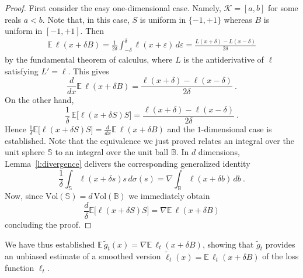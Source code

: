 \documentclass[11pt]{hackednow}
\newcommand{\E}{\mathbb{E}}
\newcommand{\cK}{\mathcal{K}}
\newcommand{\ve}{\varepsilon}
\newcommand{\Ball}{\mathbb{B}}
\newcommand{\Sphere}{\mathbb{S}}
\newcommand{\tloss}{\widetilde{\ell}}
\newcommand{\gtilde}{\widetilde{g}}
\begin{document}
%
\begin{proof}
First consider the easy one-dimensional case. Namely, $\cK = [a,b]$ for some reals $a < b$. Note that, in this case, $S$ is uniform in $\{-1,+1\}$ whereas $B$ is uniform in $[-1,+1]$. Then
\begin{align*}
    \E\,\ell(x + \delta B)
=
    \frac{1}{2\delta}\int_{-\delta}^{\delta} \ell(x + \ve)\,d\ve
=
    \frac{L(x+\delta) - L(x-\delta)}{2\delta}
\end{align*}
by the fundamental theorem of calculus, where $L$ is the antiderivative of $\ell$ satisfying $L' = \ell$.
This gives
\[
    \frac{d}{dx} \E\,\ell(x + \delta B) = \frac{\ell(x+\delta) - \ell(x-\delta)}{2\delta}~.
\]
On the other hand,
\[
    \frac{1}{\delta}\,\E\bigl[\ell(x + \delta S)S\bigr]
=
    \frac{\ell(x+\delta) - \ell(x-\delta)}{2\delta}~.
\]
Hence $\tfrac{1}{\delta}\E\bigl[\ell(x + \delta S)S\bigr] = \tfrac{d}{dx}\E\,\ell(x + \delta B)$ and the $1$-dimensional case is established. Note that the equivalence we just proved relates an integral over the unit sphere $\Sphere$ to an integral over the unit ball $\Ball$. In $d$ dimensions, Lemma~\ref{l:divergence} delivers the corresponding generalized identity
\[
    \frac{1}{\delta}\int_{\Sphere} \ell(x + \delta s)s\, d\sigma(s)
=
    \nabla\int_{\Ball} \ell(x + \delta b)\, db~.
\]
Now, since $\mathrm{Vol}(\Sphere) = d\,\mathrm{Vol}(\Ball)$ we immediately obtain
\[
    \frac{d}{\delta}\E\bigl[\ell(x + \delta S)S\bigr]
=
    \nabla\E\,\ell(x + \delta B)
\]
concluding the proof.
\end{proof}
%
We have thus established $\E\,\gtilde_t(x) = \nabla\E\,\ell_t(x + \delta B)$, showing that $\gtilde_t$ provides an unbiased estimate of a smoothed version $\tloss_t(x) = \E\,\ell_t(x + \delta B)$ of the loss function $\ell_t$.
\end{document}
